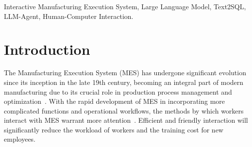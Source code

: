 \documentclass[preprint,12pt]{elsarticle}
\begin{document}
\begin{frontmatter}
\begin{keyword}
Interactive Manufacturing Execution System, Large Language Model, Text2SQL, LLM-Agent, Human-Computer Interaction.



\end{keyword}

\end{frontmatter}



\section{Introduction}

The Manufacturing Execution System (MES) has undergone significant evolution since its inception in the late 19th century, becoming an integral part of modern manufacturing due to its crucial role in production process management and optimization~\cite{doi:10.1080/09537280902938613}. 
With the rapid development of MES in incorporating more complicated functions and operational workflows, the methods by which workers interact with MES warrant more attention~\cite{9781176}. 
Efficient and friendly interaction will significantly reduce the workload of workers and the training cost for new employees.

\end{document}
